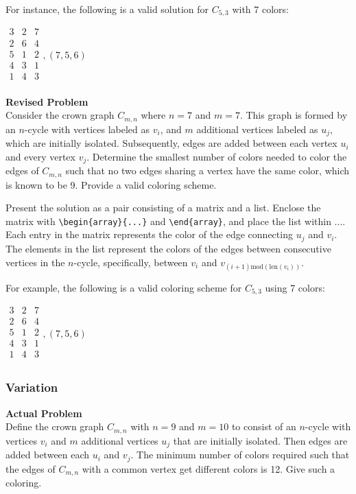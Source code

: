 For instance, the following is a valid solution for $C_{{5, 3}}$ with 7 colors:

$\boxed{
\begin{array}{ccc}
3 & 2 & 7 \\
2 & 6 & 4 \\
5 & 1 & 2 \\
4 & 3 & 1 \\
1 & 4 & 3 \\
\end{array},
(7, 5, 6)
}$



\textbf{Revised Problem}\\
Consider the crown graph $C_{m, n}$ where $n = 7$ and $m = 7$. This graph is formed by an $n$-cycle with vertices labeled as $v_i$, and $m$ additional vertices labeled as $u_j$, which are initially isolated. Subsequently, edges are added between each vertex $u_i$ and every vertex $v_j$. Determine the smallest number of colors needed to color the edges of $C_{m, n}$ such that no two edges sharing a vertex have the same color, which is known to be 9. Provide a valid coloring scheme.

Present the solution as a pair consisting of a matrix and a list. Enclose the matrix with \verb|\begin{array}{...}| and \verb|\end{array}|, and place the list within $\boxed{...}$. Each entry in the matrix represents the color of the edge connecting $u_j$ and $v_i$. The elements in the list represent the colors of the edges between consecutive vertices in the $n$-cycle, specifically, between $v_i$ and $v_{(i+1) \text{mod}(\text{len}(v_i))}$.

For example, the following is a valid coloring scheme for $C_{{5, 3}}$ using 7 colors:

$\boxed{
\begin{array}{ccc}
3 & 2 & 7 \\
2 & 6 & 4 \\
5 & 1 & 2 \\
4 & 3 & 1 \\
1 & 4 & 3 \\
\end{array},
(7, 5, 6)
}$

\subsubsection{Variation}
\textbf{Actual Problem}\\
Define the crown graph $C_{m, n}$ with $n = 9$ and $m = 10$ to consist of an $n$-cycle with vertices $v_i$ and $m$ additional vertices $u_j$ that are initially isolated. Then edges are added between each $u_i$ and $v_j$. The minimum number of colors required such that the edges of $C_{m, n}$ with a common vertex get different colors is 12. Give such a coloring.

